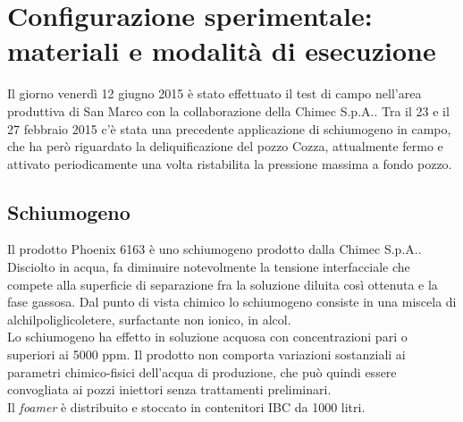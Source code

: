 
\section{Configurazione sperimentale: materiali e modalità di esecuzione}
Il giorno venerdì 12 giugno 2015 è stato effettuato il test di campo nell'area produttiva di San Marco con la collaborazione della Chimec S.p.A.. Tra il 23 e il 27 febbraio 2015 c'è stata una precedente applicazione di schiumogeno in campo, che ha però riguardato la deliquificazione del pozzo Cozza, attualmente fermo e attivato periodicamente una volta ristabilita la pressione massima a fondo pozzo.\\

\subsection{Schiumogeno}
Il prodotto Phoenix 6163 è uno schiumogeno prodotto dalla Chimec S.p.A.. Disciolto in acqua, fa diminuire notevolmente la tensione interfacciale che compete alla superficie di separazione fra la soluzione diluita così ottenuta e la fase gassosa. Dal punto di vista chimico lo schiumogeno consiste in una miscela di alchilpoliglicoletere, surfactante non ionico, in alcol. \\
Lo schiumogeno ha effetto in soluzione acquosa con concentrazioni pari o superiori ai 5000 ppm. Il prodotto non comporta variazioni sostanziali ai parametri chimico-fisici dell'acqua di produzione, che può quindi essere convogliata ai pozzi iniettori senza trattamenti preliminari.\\ 
Il \textit{foamer} è distribuito e stoccato in contenitori IBC da 1000 litri.
